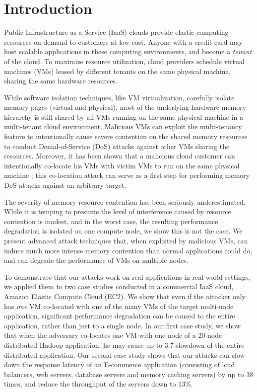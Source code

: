 \documentclass{sig-alternate}
\newcommand{\attackname}{memory DoS attacks\xspace}
\begin{document}
\section{Introduction}
\label{sec:intro}

Public Infrastructure-as-a-Service (IaaS) clouds provide elastic computing resources on demand to customers at low cost. Anyone with a credit card may host scalable 
applications in these computing environments, and become a {\em tenant} of the 
cloud. To maximize resource utilization, cloud providers schedule virtual machines 
(VMs) leased by different tenants on the same physical machine, sharing the same 
hardware resources.

While software isolation techniques, like VM virtualization, carefully isolate 
memory pages (virtual and physical), most of the underlying hardware memory 
hierarchy is still shared by all VMs running on the same physical machine
in a multi-tenant cloud environment. Malicious VMs can exploit the multi-tenancy 
feature to intentionally cause severe contention on the shared memory resources to 
conduct Denial-of-Service (DoS) attacks against other VMs sharing 
the resources. Moreover, it has been shown that a malicious cloud customer can 
intentionally co-locate his VMs with victim VMs to run on the same physical 
machine \cite{RiTrSh:09, Varadarajan:2015:PVS, Xu:2015:MSC}; 
this co-location attack can serve as a first step for performing \attackname 
against an arbitrary target. 

The severity of memory resource contention has been seriously underestimated. While
it is temping to presume the level of interference caused by resource contention is
modest, and in the worst case, the resulting performance degradation is isolated on
one compute node, we show this is not the case. We present advanced attack techniques 
that, when exploited by malicious VMs, can induce much more intense memory contention 
than normal applications could do, and can degrade the performance of VMs on multiple nodes.

To demonstrate that our attacks work on real applications in real-world 
settings, we applied them to two case studies conducted in a commercial IaaS 
cloud, Amazon Elastic Compute Cloud (EC2). We show that even if the attacker only 
has \textit{one} VM co-located with one of the many VMs of the target multi-node 
application, significant performance degradation can be caused to the entire 
application, rather than just to a single node. In our first case study, we show 
that when the adversary co-locates one VM with one node of a 20-node distributed 
Hadoop application, he may cause up to 3.7 slowdown of the entire 
distributed application. Our second case study shows that our 
attacks can slow down the response latency of an E-commerce application 
(consisting of load balancers, web servers, database servers and memory caching 
servers) by up to 38 times, and reduce the throughput of the servers down to 13\%.
 
\end{document}
